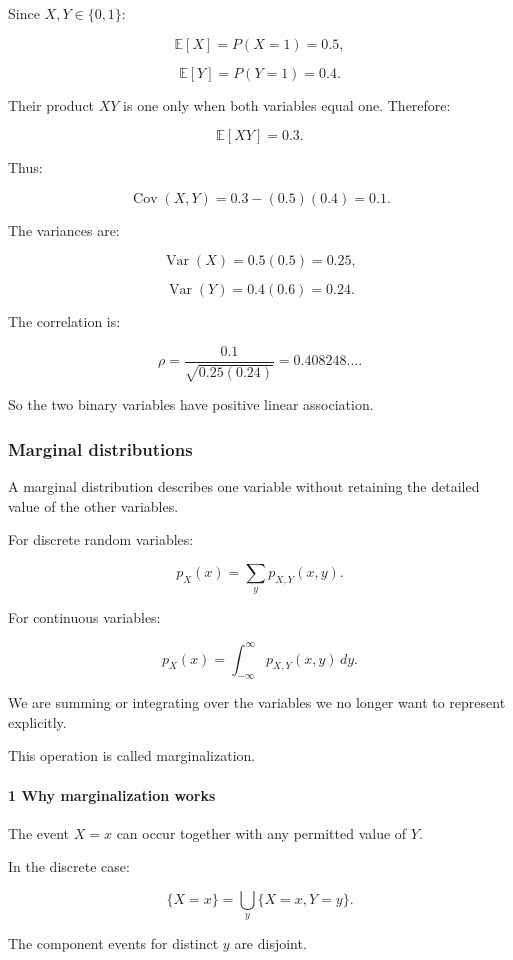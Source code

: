 Since \(X,Y\in\{0,1\}\):

\[
 \mathbb E[X]=P(X=1)=0.5,
\]

\[
 \mathbb E[Y]=P(Y=1)=0.4.
\]

Their product \(XY\) is one only when both variables equal one. Therefore:

\[
 \mathbb E[XY]=0.3.
\]

Thus:

\[
 \operatorname{Cov}(X,Y) = 0.3-(0.5)(0.4) =\boxed{0.1}.
\]

The variances are:

\[
 \operatorname{Var}(X)=0.5(0.5)=0.25,
\]

\[
 \operatorname{Var}(Y)=0.4(0.6)=0.24.
\]

The correlation is:

\[
 \rho= \frac{0.1}{\sqrt{0.25(0.24)}} =\boxed{0.408248\ldots}.
\]

So the two binary variables have positive linear association.

\subsubsection{Marginal distributions}\label{marginal-distributions}

A marginal distribution describes one variable without retaining the detailed value of the other variables.

For discrete random variables:

\[
 \boxed{ p_X(x)=\sum_yp_{X,Y}(x,y) }.
\]

For continuous variables:

\[
 \boxed{ p_X(x)= \int_{-\infty}^{\infty} p_{X,Y}(x,y)\,dy }.
\]

We are summing or integrating over the variables we no longer want to represent explicitly.

This operation is called marginalization.

\paragraph{1 Why marginalization works}\label{why-marginalization-works}

The event \(X=x\) can occur together with any permitted value of \(Y\).

In the discrete case:

\[
 \{X=x\} = \bigcup_y\{X=x,Y=y\}.
\]

The component events for distinct \(y\) are disjoint.

